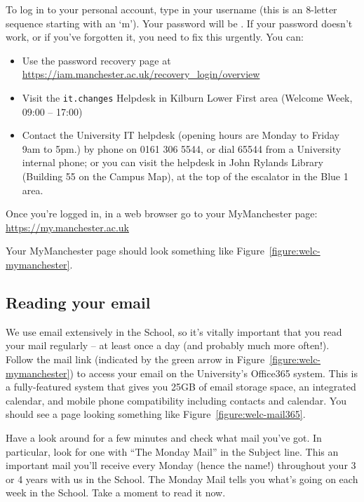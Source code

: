 To log in to your personal account, type in your username (this is an
8-letter sequence starting with an `m'). Your password will
be \splunge. If your password doesn't work, or if you've forgotten it,
you need to fix this urgently. You can:

\begin{itemize}
\item Use the password recovery page at\\ \url{https://iam.manchester.ac.uk/recovery_login/overview}
\item Visit the \verb|it.changes| Helpdesk in Kilburn Lower First area (Welcome Week, 09:00 -- 17:00)
\item Contact the University IT helpdesk (opening hours are Monday to Friday 9am to 5pm.) by phone on 0161 306 5544, or dial 65544 from a University internal phone; or you can visit the helpdesk in John Rylands Library (Building 55 on
the Campus Map), at the top of the escalator in the Blue 1 area.
\end{itemize}

Once you're logged in, in a web browser go to your MyManchester page:\\ \url{https://my.manchester.ac.uk}

Your MyManchester page should look something like
Figure~\ref{figure:welc-mymanchester}.

\subsection{Reading your email}

We use email extensively in the School, so it's vitally important that
you read your mail regularly -- at least once a day (and probably much
more often!). Follow the mail link (indicated by the green arrow in
Figure~\ref{figure:welc-mymanchester}) to access your email on the
University's Office365 system. This is a fully-featured system that
gives you 25GB of email storage space, an integrated calendar, and
mobile phone compatibility including contacts and calendar. You should
see a page looking something like Figure~\ref{figure:welc-mail365}.

Have a look around for a few minutes and check what mail you've
got. In particular, look for one with ``The Monday Mail'' in the
Subject line. This an important mail you'll receive every Monday
(hence the name!) throughout your 3 or 4 years with us in the
School. The Monday Mail tells you what's going on each week in the
School. Take a moment to read it now.

